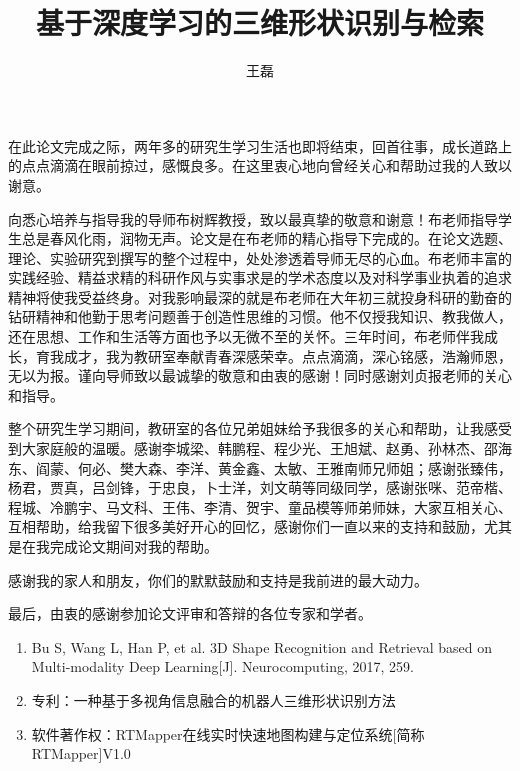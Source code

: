 \documentclass[twoside,UTF8]{nputhesis}
\title[3D Shape Recognition and Retrieval Based on Depth Learning]{ 基于深度学习的三维形状识别与检索}
\author[Lei Wang]{王磊}
\begin{document}
 
\newpage

\makecover  %
\frontmatter



\tableofcontents 

\mainmatter  %














\backmatter

%   


\backmatter
\Appendix

\Thanks
在此论文完成之际，两年多的研究生学习生活也即将结束，回首往事，成长道路上的点点滴滴在眼前掠过，感慨良多。在这里衷心地向曾经关心和帮助过我的人致以谢意。

向悉心培养与指导我的导师布树辉教授，致以最真挚的敬意和谢意！布老师指导学生总是春风化雨，润物无声。论文是在布老师的精心指导下完成的。在论文选题、理论、实验研究到撰写的整个过程中，处处渗透着导师无尽的心血。布老师丰富的实践经验、精益求精的科研作风与实事求是的学术态度以及对科学事业执着的追求精神将使我受益终身。对我影响最深的就是布老师在大年初三就投身科研的勤奋的钻研精神和他勤于思考问题善于创造性思维的习惯。他不仅授我知识、教我做人，还在思想、工作和生活等方面也予以无微不至的关怀。三年时间，布老师伴我成长，育我成才，我为教研室奉献青春深感荣幸。点点滴滴，深心铭感，浩瀚师恩，无以为报。谨向导师致以最诚挚的敬意和由衷的感谢！同时感谢刘贞报老师的关心和指导。

整个研究生学习期间，教研室的各位兄弟姐妹给予我很多的关心和帮助，让我感受到大家庭般的温暖。感谢李城梁、韩鹏程、程少光、王旭斌、赵勇、孙林杰、邵海东、阎蒙、何必、樊大森、李洋、黄金鑫、太敏、王雅南师兄师姐；感谢张臻伟，杨君，贾真，吕剑锋，于忠良，卜士洋，刘文萌等同级同学，感谢张咪、范帝楷、程城、冷鹏宇、马文科、王伟、李清、贺宇、童品模等师弟师妹，大家互相关心、互相帮助，给我留下很多美好开心的回忆，感谢你们一直以来的支持和鼓励，尤其是在我完成论文期间对我的帮助。

感谢我的家人和朋友，你们的默默鼓励和支持是我前进的最大动力。

最后，由衷的感谢参加论文评审和答辩的各位专家和学者。

\Work

\begin{enumerate}
\item Bu S, Wang L, Han P, et al. 3D Shape Recognition and Retrieval based on Multi-modality Deep Learning[J]. Neurocomputing, 2017, 259.
\item 专利：一种基于多视角信息融合的机器人三维形状识别方法
\item 软件著作权：RTMapper在线实时快速地图构建与定位系统[简称RTMapper]V1.0
\end{enumerate}


 
\newpage
\end{document}
